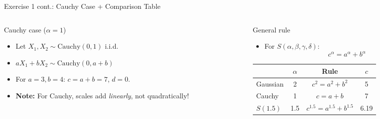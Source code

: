 \documentclass[9pt, aspectratio=169, t]{beamer}
\begin{document}
\begin{frame}{Exercise 1 cont.: Cauchy Case + Comparison Table}
    \begin{cminipage}{0.95\textwidth}
\begin{columns}[T]
\begin{column}{0.48\textwidth}
\begin{block}{Cauchy case ($\alpha = 1$)}
\begin{itemize}\setlength{\itemsep}{0pt}
    \item Let $X_1, X_2 \sim \text{Cauchy}(0,1)$ i.i.d.
    \item $aX_1 + bX_2 \sim \text{Cauchy}(0, a+b)$
    \item For $a=3, b=4$: $c = a + b = 7$, $d = 0$.
    \item \textbf{Note:} For Cauchy, scales add \textit{linearly}, not quadratically!
\end{itemize}
\end{block}
\end{column}
\begin{column}{0.48\textwidth}
\begin{block}{General rule}
\begin{itemize}\setlength{\itemsep}{0pt}
    \item For $S(\alpha, \beta, \gamma, \delta)$:
$$c^\alpha = a^\alpha + b^\alpha$$
\end{itemize}

\vspace{0.2cm}
\renewcommand{\arraystretch}{1.3}
\begin{tabular}{lccc}
\toprule
& $\alpha$ & Rule & $c$ \\
\midrule
Gaussian & 2 & $c^2 = a^2+b^2$ & 5 \\
Cauchy & 1 & $c = a+b$ & 7 \\
$S(1.5)$ & 1.5 & $c^{1.5} = a^{1.5}+b^{1.5}$ & 6.19 \\
\bottomrule
\end{tabular}
\end{block}
\end{column}
\end{columns}
    \end{cminipage}
\end{frame}
\end{document}
